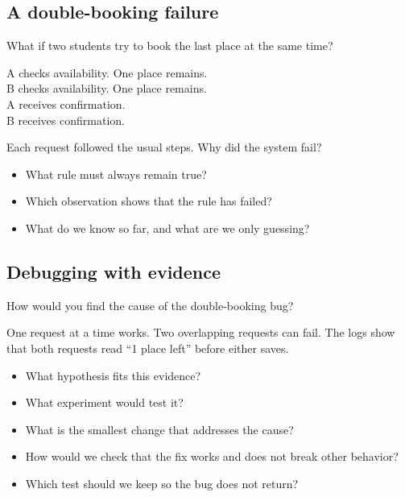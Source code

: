 \documentclass[11pt]{article}
\begin{document}
\subsection{A double-booking failure}
\begin{uncovered}
What if two students try to book the last place at the same time?
\end{uncovered}
\begin{uncovered}
A checks availability. One place remains.\\
B checks availability. One place remains.\\
A receives confirmation.\\
B receives confirmation.

Each request followed the usual steps. Why did the system fail?
\end{uncovered}
\begin{uncovered}
\begin{itemize}
  \item What rule must always remain true?
  \item Which observation shows that the rule has failed?
  \item What do we know so far, and what are we only guessing?
\end{itemize}
\end{uncovered}

\subsection{Debugging with evidence}
\begin{uncovered}
How would you find the cause of the double-booking bug?
\end{uncovered}
\begin{uncovered}
One request at a time works. Two overlapping requests can fail. The logs show that both requests read ``1 place left'' before either saves.
\begin{itemize}
  \item What hypothesis fits this evidence?
  \item What experiment would test it?
\end{itemize}
\end{uncovered}
\begin{uncovered}
\begin{itemize}
  \item What is the smallest change that addresses the cause?
  \item How would we check that the fix works and does not break other behavior?
  \item Which test should we keep so the bug does not return?
\end{itemize}
\end{uncovered}
\end{document}
